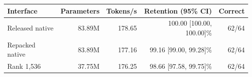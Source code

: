 \begin{tabular}{lrrrr}
\toprule
Interface & Parameters & Tokens/s & Retention (95\% CI) & Correct \\
\midrule
Released native & 83.89M & 178.65 & 100.00 [100.00, 100.00]\% & 62/64 \\
Repacked native & 83.89M & 177.16 & 99.16 [99.00, 99.28]\% & 62/64 \\
Rank 1,536 & 37.75M & 176.25 & 98.66 [97.58, 99.75]\% & 62/64 \\
\bottomrule
\end{tabular}
